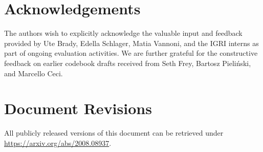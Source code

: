 
\clearpairofpagestyles
\chead{\headmark}
\ifoot{\ifootertext}
\ofoot{\ofootertext}
\cfoot{\thepage}

\section*{Acknowledgements}

The authors wish to explicitly acknowledge the valuable input and feedback provided by Ute Brady, Edella Schlager, Matia Vannoni, and the IGRI interns as part of ongoing evaluation activities. We are further grateful for the constructive feedback on earlier codebook drafts received from Seth Frey, Bartosz Pieli\'{n}ski, and Marcello Ceci.


\section*{Document Revisions}

All publicly released versions of this document can be retrieved under \url{https://arxiv.org/abs/2008.08937}.

